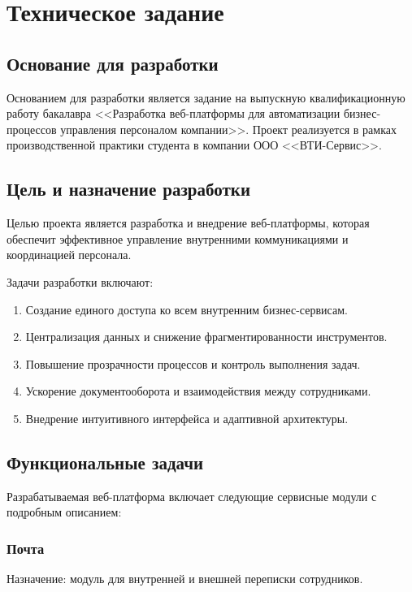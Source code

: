 \section{Техническое задание}

\subsection{Основание для разработки}

Основанием для разработки является задание на выпускную квалификационную работу бакалавра <<Разработка веб-платформы для автоматизации бизнес-процессов управления персоналом компании>>. Проект реализуется в рамках производственной практики студента в компании ООО <<ВТИ-Сервис>>.

\subsection{Цель и назначение разработки}

Целью проекта является разработка и внедрение веб-платформы, которая обеспечит эффективное управление внутренними коммуникациями и координацией персонала.

Задачи разработки включают:

\begin{enumerate}
  \item Создание единого доступа ко всем внутренним бизнес-сервисам.
  \item Централизация данных и снижение фрагментированности инструментов.
  \item Повышение прозрачности процессов и контроль выполнения задач.
  \item Ускорение документооборота и взаимодействия между сотрудниками.
  \item Внедрение интуитивного интерфейса и адаптивной архитектуры.
\end{enumerate}

\subsection{Функциональные задачи}

Разрабатываемая веб-платформа включает следующие сервисные модули с подробным описанием:

\subsubsection{Почта}

Назначение: модуль для внутренней и внешней переписки сотрудников.

